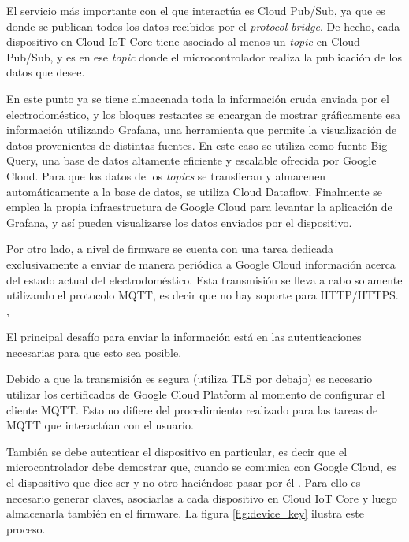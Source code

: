 El servicio más importante con el que interactúa es Cloud Pub/Sub, ya que es donde se publican todos los datos recibidos por el \emph{protocol bridge}. De hecho, cada dispositivo en Cloud IoT Core tiene asociado al menos un \emph{topic} en Cloud Pub/Sub, y es en ese \emph{topic} donde el microcontrolador realiza la publicación de los datos que desee.

En este punto ya se tiene almacenada toda la información cruda enviada por el electrodoméstico, y los bloques restantes se encargan de mostrar gráficamente esa información utilizando Grafana, una herramienta que permite la visualización de datos provenientes de distintas fuentes. En este caso se utiliza como fuente Big Query, una base de datos altamente eficiente y escalable ofrecida por Google Cloud. Para que los datos de los \emph{topics} se transfieran y almacenen automáticamente a la base de datos, se utiliza Cloud Dataflow. Finalmente se emplea la propia infraestructura de Google Cloud para levantar la aplicación de Grafana, y así pueden visualizarse los datos enviados por el dispositivo.

Por otro lado, a nivel de firmware se cuenta con una tarea dedicada exclusivamente a enviar de manera periódica a Google Cloud información acerca del estado actual del electrodoméstico. Esta transmisión se lleva a cabo solamente utilizando el protocolo MQTT, es decir que no hay soporte para HTTP/HTTPS. ,

El principal desafío para enviar la información está en las autenticaciones necesarias para que esto sea posible. 

Debido a que la transmisión es segura (utiliza TLS por debajo) es necesario utilizar los certificados de Google Cloud Platform al momento de configurar el cliente MQTT. Esto no difiere del procedimiento realizado para las tareas de MQTT que interactúan con el usuario.

También se debe autenticar el dispositivo en particular, es decir que el microcontrolador debe demostrar que, cuando se comunica con Google Cloud, es el dispositivo que dice ser y no otro haciéndose pasar por él \citep{device_security}. Para ello es necesario generar claves, asociarlas a cada dispositivo en Cloud IoT Core y luego almacenarla también en el firmware. La figura \ref{fig:device_key} ilustra este proceso.

